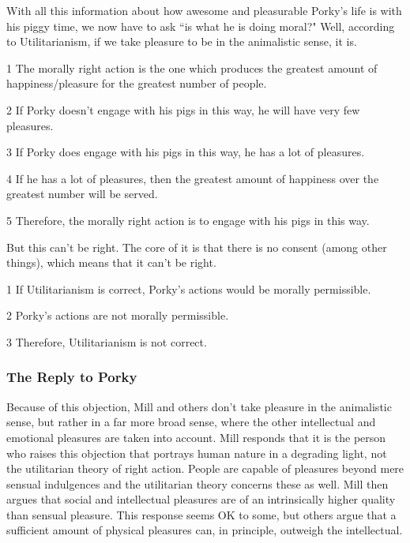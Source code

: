 With all this information about how awesome and pleasurable Porky's life is with his piggy time, we now have to ask ``is what he is doing moral?" Well, according to Utilitarianism, if we take pleasure to be in the animalistic sense, it is.
\begin{earg}
    \item[1] The morally right action is the one which produces the greatest amount of happiness/pleasure for the greatest number of people.
    \item[2] If Porky doesn’t engage with his pigs in this way, he will have very few pleasures.
    \item[3] If Porky does engage with his pigs in this way, he has a lot of pleasures.
    \item[4] If he has a lot of pleasures, then the greatest amount of happiness over the greatest number will be served.
    \item[5] Therefore, the morally right action is to engage with his pigs in this way.
\end{earg}
But this can't be right. The core of it is that there is no consent (among other things), which means that it can't be right.
\begin{earg}
    \item[1] If Utilitarianism is correct, Porky’s actions would be morally permissible.
    \item[2] Porky’s actions are not morally permissible.
    \item[3] Therefore, Utilitarianism is not correct.
\end{earg}
\subsubsection{The Reply to Porky}

Because of this objection, Mill and others don't take pleasure in the animalistic sense, but rather in a far more broad sense, where the other intellectual and emotional pleasures are taken into account. Mill responds that it is the person who raises this objection that portrays human nature in a degrading light, not the utilitarian theory of right action. People are capable of pleasures beyond mere sensual indulgences and the utilitarian theory concerns these as well. Mill then argues that social and intellectual pleasures are of an intrinsically higher quality than sensual pleasure. This response seems OK to some, but others argue that a sufficient amount of physical pleasures can, in principle, outweigh the intellectual. 

